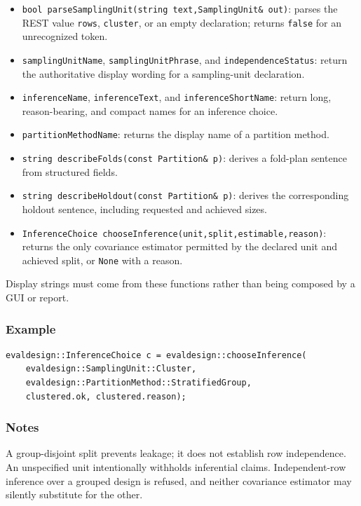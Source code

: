 \begin{itemize}
\item \texttt{bool parseSamplingUnit(string text,SamplingUnit\& out)}: parses
      the REST value \texttt{rows}, \texttt{cluster}, or an empty declaration;
      returns \texttt{false} for an unrecognized token.
\item \texttt{samplingUnitName}, \texttt{samplingUnitPhrase}, and
      \texttt{independenceStatus}: return the authoritative display wording for
      a sampling-unit declaration.
\item \texttt{inferenceName}, \texttt{inferenceText}, and
      \texttt{inferenceShortName}: return long, reason-bearing, and compact
      names for an inference choice.
\item \texttt{partitionMethodName}: returns the display name of a partition
      method.
\item \texttt{string describeFolds(const Partition\& p)}: derives a fold-plan
      sentence from structured fields.
\item \texttt{string describeHoldout(const Partition\& p)}: derives the
      corresponding holdout sentence, including requested and achieved sizes.
\item \texttt{InferenceChoice chooseInference(unit,split,estimable,reason)}:
      returns the only covariance estimator permitted by the declared unit and
      achieved split, or \texttt{None} with a reason.
\end{itemize}

Display strings must come from these functions rather than being composed by a
GUI or report.

\subsubsection{Example}
\begin{verbatim}
evaldesign::InferenceChoice c = evaldesign::chooseInference(
    evaldesign::SamplingUnit::Cluster,
    evaldesign::PartitionMethod::StratifiedGroup,
    clustered.ok, clustered.reason);
\end{verbatim}

\subsubsection{Notes}
A group-disjoint split prevents leakage; it does not establish row independence.
An unspecified unit intentionally withholds inferential claims.  Independent-row
inference over a grouped design is refused, and neither covariance estimator may
silently substitute for the other.

